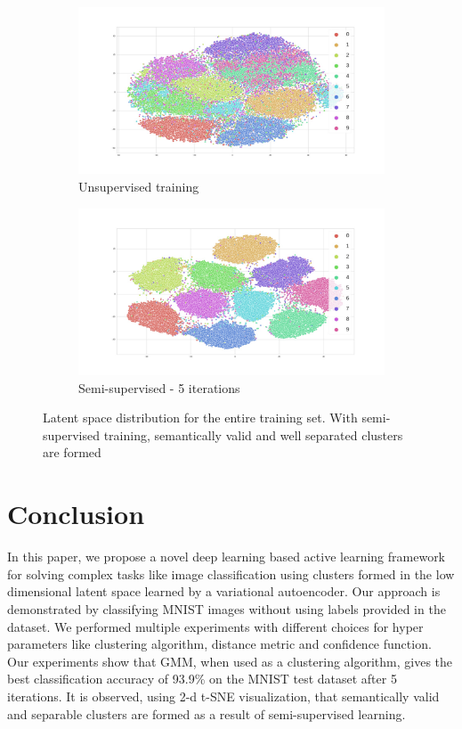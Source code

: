 \documentclass[runningheads]{llncs}
\begin{document}
\begin{figure}[!h]
\centering
\begin{subfigure}[t]{.4\textwidth}
  \centering
  \includegraphics[width=.8\linewidth]{images/tsne_unsup.jpg}
  \caption{Unsupervised training}
  \label{tsne_un}
\end{subfigure}\hfill
\begin{subfigure}[t]{.4\textwidth}
  \centering
  \includegraphics[width=.8\linewidth]{images/tsne_semi.jpg}
  \caption{Semi-supervised - 5 iterations }
  \label{tsne_semi}
\end{subfigure}
\caption{Latent space distribution for the entire training set. With semi-supervised training, semantically valid and well separated clusters are formed}
\label{tsne}
\end{figure}
\section{Conclusion}
In this paper, we propose a novel deep learning based active learning framework for solving complex tasks like image classification using clusters formed in the low dimensional latent space learned by a variational autoencoder.
Our approach is demonstrated by classifying MNIST images without using labels provided in the dataset.
We performed multiple experiments with different choices for hyper parameters like clustering algorithm, distance metric and confidence function.
Our experiments show that GMM, when used as a clustering algorithm,  gives the best classification accuracy of 93.9\% on the MNIST test dataset after 5 iterations.
It is observed, using 2-d t-SNE visualization, that  semantically valid and separable clusters are formed as a result of semi-supervised learning.
\end{document}
